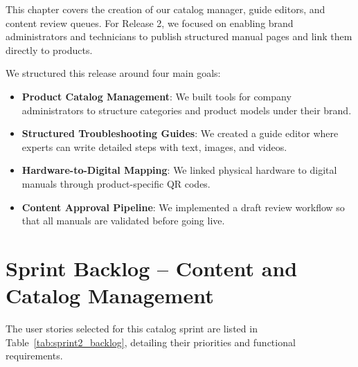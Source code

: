 \documentclass[12pt,a4paper]{report}
\begin{document}
This chapter covers the creation of our catalog manager, guide editors, and content review queues. For Release 2, we focused on enabling brand administrators and technicians to publish structured manual pages and link them directly to products.

We structured this release around four main goals:
\begin{itemize}
    \item \textbf{Product Catalog Management}: We built tools for company administrators to structure categories and product models under their brand.
    \item \textbf{Structured Troubleshooting Guides}: We created a guide editor where experts can write detailed steps with text, images, and videos.
    \item \textbf{Hardware-to-Digital Mapping}: We linked physical hardware to digital manuals through product-specific QR codes.
    \item \textbf{Content Approval Pipeline}: We implemented a draft review workflow so that all manuals are validated before going live.
\end{itemize}

\section{Sprint Backlog -- Content and Catalog Management}

The user stories selected for this catalog sprint are listed in Table~\ref{tab:sprint2_backlog}, detailing their priorities and functional requirements.

\renewcommand{\arraystretch}{1.3}
\setlength{\tabcolsep}{8pt}

\begin{table}[!htbp]
\centering
\caption{User stories for Release 2 (Content and Catalog Management)}
\label{tab:sprint2_backlog}
\end{table}
\end{document}
